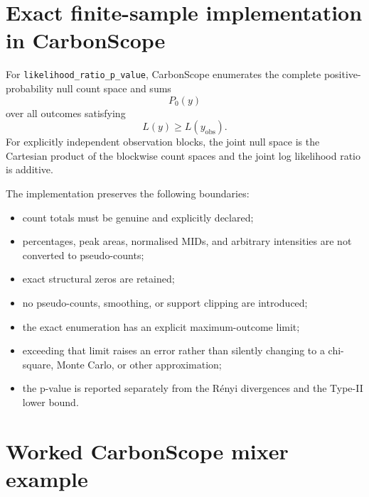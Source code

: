 \documentclass[11pt]{article}
\begin{document}
\section{Exact finite-sample implementation in CarbonScope}

For \texttt{likelihood\_ratio\_p\_value}, CarbonScope enumerates the complete
positive-probability null count space and sums
\begin{equation}
P_0(y)
\end{equation}
over all outcomes satisfying
\begin{equation}
L(y)\ge L(y_{\mathrm{obs}}).
\end{equation}
For explicitly independent observation blocks, the joint null space is the
Cartesian product of the blockwise count spaces and the joint log likelihood
ratio is additive.

The implementation preserves the following boundaries:
\begin{itemize}
    \item count totals must be genuine and explicitly declared;
    \item percentages, peak areas, normalised MIDs, and arbitrary intensities are not converted to pseudo-counts;
    \item exact structural zeros are retained;
    \item no pseudo-counts, smoothing, or support clipping are introduced;
    \item the exact enumeration has an explicit maximum-outcome limit;
    \item exceeding that limit raises an error rather than silently changing to a chi-square, Monte Carlo, or other approximation;
    \item the p-value is reported separately from the Rényi divergences and the Type-II lower bound.
\end{itemize}

\section{Worked CarbonScope mixer example}
\end{document}
